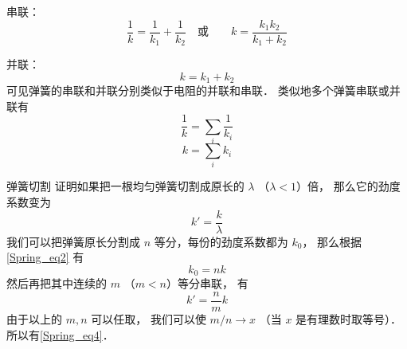 
\begin{issues}
\issueDraft
\end{issues}


串联：
\begin{equation}
\frac{1}{k} = \frac{1}{k_1} + \frac{1}{k_2}
\quad \text{或} \qquad
k = \frac{k_1 k_2}{k_1 + k_2}
\end{equation}

并联：
\begin{equation}
k = k_1 + k_2
\end{equation}
可见弹簧的串联和并联分别类似于电阻的并联和串联． 类似地多个弹簧串联或并联有
\begin{equation}\label{Spring_eq2}
\frac{1}{k} = \sum_i \frac{1}{k_i}
\end{equation}
\begin{equation}\label{Spring_eq3}
k = \sum_i k_i
\end{equation}



\begin{example}{弹簧切割}
证明如果把一根均匀弹簧切割成原长的 $\lambda$ （$\lambda < 1$）倍， 那么它的劲度系数变为
\begin{equation}\label{Spring_eq4}
k' = \frac{k}{\lambda}
\end{equation}
我们可以把弹簧原长分割成 $n$ 等分，每份的劲度系数都为 $k_0$， 那么根据\autoref{Spring_eq2} 有
\begin{equation}
k_0 = nk
\end{equation}
然后再把其中连续的 $m$ （$m < n$）等分串联， 有
\begin{equation}
k' = \frac{n}{m}k
\end{equation}
由于以上的 $m, n$ 可以任取， 我们可以使 $m/n \to x$ （当 $x$ 是有理数时取等号）．所以有\autoref{Spring_eq4}．
\end{example}

